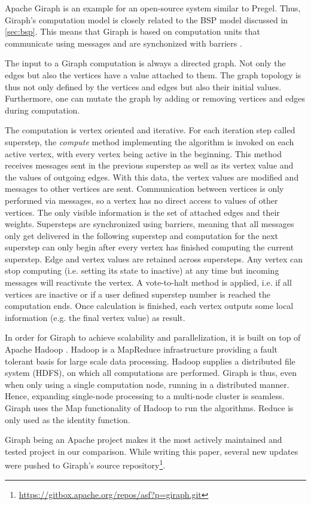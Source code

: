 Apache Giraph is an example for an open-source system similar to Pregel.
Thus, Giraph's computation model is closely related to the BSP model discussed in \autoref{sec:bsp}. 
This means that Giraph is based on computation units that communicate using messages and are synchonized with barriers \cite{Giraph}.

The input to a Giraph computation is always a directed graph. Not only the edges but also the vertices have a value attached to them. The graph topology is thus not only defined by the vertices and edges but also their initial values.
Furthermore, one can mutate the graph by adding or removing vertices and edges during computation.

The computation is vertex oriented and iterative.
For each iteration step called superstep, the \emph{compute} method implementing the algorithm is invoked on each active vertex, with every vertex being active in the beginning.
This method receives messages sent in the previous superstep as well as its vertex value and the values of outgoing edges.
With this data, the vertex values are modified and messages to other vertices are sent.
Communication between vertices is only performed via messages, so a vertex has no direct access to values of other vertices. The only visible information is the set of attached edges and their weights.
Supersteps are synchronized using barriers, meaning that all messages only get delivered in the following superstep and computation for the next superstep can only begin after every vertex has finished computing the current superstep.
Edge and vertex values are retained across supersteps.
Any vertex can stop computing (i.e. setting its state to inactive) at any time but incoming messages will reactivate the vertex.
A vote-to-halt method is applied, i.e. if all vertices are inactive or if a user defined superstep number is reached the computation ends.
Once calculation is finished, each vertex outputs some local information (e.g. the final vertex value) as result.

In order for Giraph to achieve scalability and parallelization, it is built on top of Apache Hadoop \cite{Giraph}.
Hadoop is a MapReduce infrastructure providing a fault tolerant basis for large scale data processing.
Hadoop supplies a distributed file system (HDFS), on which all computations are performed.
Giraph is thus, even when only using a single computation node, running in a distributed manner.
Hence, expanding single-node processing to a multi-node cluster is seamless.
Giraph uses the Map functionality of Hadoop to run the algorithms. Reduce is only used as the identity function.

Giraph being an Apache project makes it the most actively maintained and tested project in our comparison. While writing this paper, several new updates were pushed to Giraph's source repository\footnote{\url{https://gitbox.apache.org/repos/asf?p=giraph.git}}.

